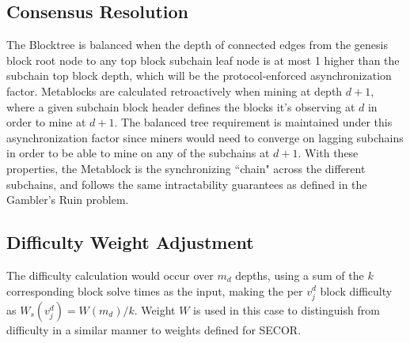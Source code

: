 \documentclass{article}
\begin{document}
\subsection{Consensus Resolution}
The Blocktree is balanced when the depth of connected edges from the genesis block root node to any top block subchain leaf node is at most 1 higher than the subchain top block depth, which will be the protocol-enforced asynchronization factor. Metablocks are calculated retroactively when mining at depth $d+1$, where a given subchain block header defines the blocks it's observing at $d$ in order to mine at $d+1$. The balanced tree requirement is maintained under this asynchronization factor since miners would need to converge on lagging subchains in order to be able to mine on any of the subchains at $d+1$. With these properties, the Metablock is the synchronizing ``chain" across the different subchains, and follows the same intractability guarantees as defined in the Gambler's Ruin problem\cite{nakamoto}.
\subsection{Difficulty Weight Adjustment}
The difficulty calculation would occur over $m_d$ depths, using a sum of the $k$ corresponding block solve times as the input, making the per $v_j^d$ block difficulty as $W_s(v_j^d) = W(m_d) / k$. Weight $W$ is used in this case to distinguish from difficulty in a similar manner to weights defined for SECOR\cite{khawaja}.
\end{document}

